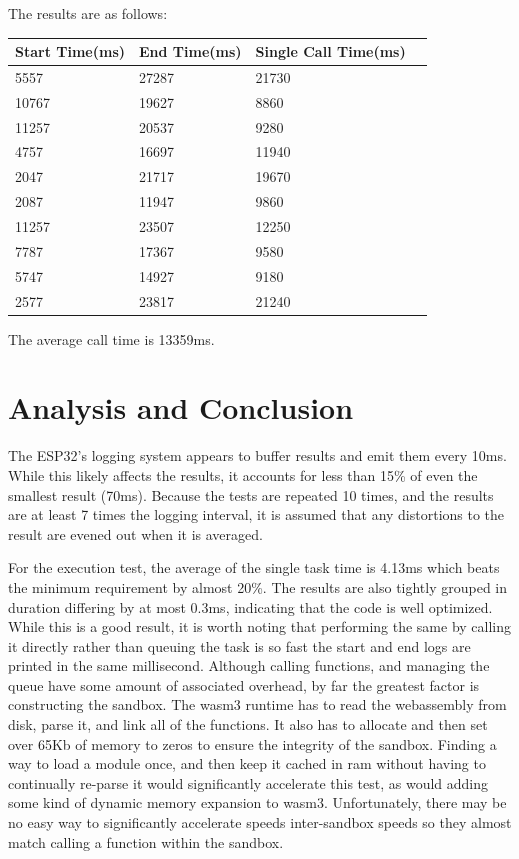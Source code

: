 \documentclass{article}
\begin{document}
\begin{enumerate}
The results are as follows:
\begin{table}[H]
\begin{tabular}{|l|l|l|l|}
\hline
Start Time(ms)		&End Time(ms)				&Single Call Time(ms)\\ \hline
5557	 & 27287	 & 21730\\ \hline
10767	 & 19627	 & 8860\\ \hline
11257	 & 20537	 & 9280\\ \hline
4757	 & 16697	 & 11940\\ \hline
2047	 & 21717	 & 19670\\ \hline
2087	 & 11947	 & 9860\\ \hline
11257	 & 23507	 & 12250\\ \hline
7787	 & 17367	 & 9580\\ \hline
5747	 & 14927	 & 9180\\ \hline
2577	 & 23817	 & 21240\\ \hline
\end{tabular}
\end{table}

The average call time is 13359ms.

\end{enumerate}


\section{Analysis and Conclusion}
The ESP32's logging system appears to buffer results and emit them every 10ms. While this likely affects the results, it accounts for less than 15\% of even the smallest result (70ms). Because the tests are repeated 10 times, and the results are at least 7 times the logging interval, it is assumed that any distortions to the result are evened out when it is averaged.

For the execution test, the average of the single task time is 4.13ms which beats the minimum requirement by almost 20\%. The results are also tightly grouped in duration differing by at most 0.3ms, indicating that the code is well optimized. While this is a good result, it is worth noting that performing the same by calling it directly rather than queuing the task is so fast the start and end logs are printed in the same millisecond. Although calling functions, and managing the queue have some amount of associated overhead, by far the greatest factor is constructing the sandbox. The wasm3 runtime has to read the webassembly from disk, parse it, and link all of the functions. It also has to allocate and then set over 65Kb of memory to zeros to ensure the integrity of the sandbox. Finding a way to load a module once, and then keep it cached in ram without having to continually re-parse it would significantly accelerate this test, as would adding some kind of dynamic memory expansion to wasm3. Unfortunately, there may be no easy way to significantly accelerate speeds inter-sandbox speeds so they almost match calling a function within the sandbox.
\end{document}
